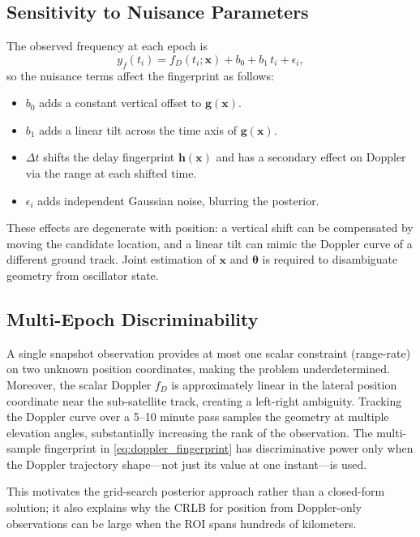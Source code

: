 \subsection{Sensitivity to Nuisance Parameters}
The observed frequency at each epoch is
\begin{equation}
  y_f(t_i) = f_D(t_i; \mathbf{x}) + b_0 + b_1\,t_i + \epsilon_i ,
\end{equation}
so the nuisance terms affect the fingerprint as follows:
\begin{itemize}
  \item $b_0$ adds a constant vertical offset to $\mathbf{g}(\mathbf{x})$.
  \item $b_1$ adds a linear tilt across the time axis of $\mathbf{g}(\mathbf{x})$.
  \item $\Delta t$ shifts the delay fingerprint $\mathbf{h}(\mathbf{x})$ and has
        a secondary effect on Doppler via the range at each shifted time.
  \item $\epsilon_i$ adds independent Gaussian noise, blurring the posterior.
\end{itemize}
These effects are degenerate with position: a vertical shift can be compensated
by moving the candidate location, and a linear tilt can mimic the Doppler curve
of a different ground track.  Joint estimation of $\mathbf{x}$ and
$\boldsymbol{\theta}$ is required to disambiguate geometry from oscillator
state.

\subsection{Multi-Epoch Discriminability}
A single snapshot observation provides at most one scalar constraint
(range-rate) on two unknown position coordinates, making the problem
underdetermined.  Moreover, the scalar Doppler $f_D$ is approximately linear
in the lateral position coordinate near the sub-satellite track, creating
a left-right ambiguity.  Tracking the Doppler curve over a 5--10 minute pass
samples the geometry at multiple elevation angles, substantially increasing
the rank of the observation.  The multi-sample fingerprint in
\eqref{eq:doppler_fingerprint} has discriminative power only when the Doppler
trajectory shape---not just its value at one instant---is used.

This motivates the grid-search posterior approach rather than a closed-form
solution; it also explains why the CRLB for position from Doppler-only
observations can be large when the ROI spans hundreds of kilometers.

